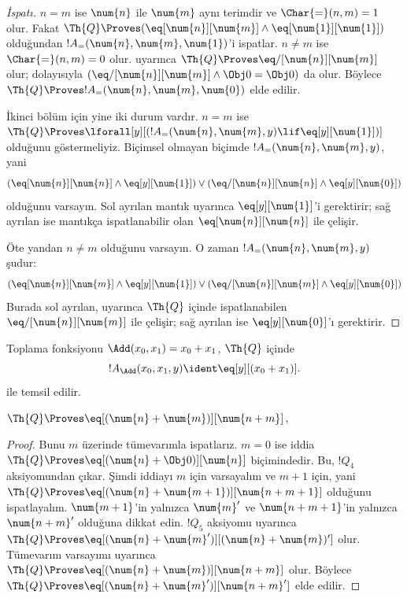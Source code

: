 \documentclass[../../../include/open-logic-section]{subfiles}
\begin{document}
\begin{proof}[ İspatı]
$n=m$ ise $\num{n}$ ile $\num{m}$ aynı terimdir ve $\Char{=}(n,m)=1$ olur.
Fakat $\Th{Q} \Proves (\eq[\num{n}][\num{m}] \land
\eq[\num{1}][\num{1}])$ olduğundan $!A_=(\num{n},\num{m},\num{1})$'i
ispatlar. $n\neq m$ ise $\Char{=}(n,m)=0$ olur.
 uyarınca $\Th{Q} \Proves
\eq/[\num{n}][\num{m}]$ olur; dolayısıyla
$(\eq/[\num{n}][\num{m}] \land \Obj 0 = \Obj 0)$ da olur. Böylece
$\Th{Q} \Proves !A_=(\num{n}, \num{m}, \num{0})$ elde edilir.

İkinci bölüm için yine iki durum vardır. $n=m$ ise
$\Th{Q} \Proves \lforall[y][(!A_=(\num{n}, \num{m}, y)
  \lif \eq[y][\num{1}])]$ olduğunu göstermeliyiz. Biçimsel olmayan biçimde
$!A_=(\num{n},\num{m},y)$, yani
\[
(\eq[\num{n}][\num{n}] \land \eq[y][\num{1}]) \lor
(\eq/[\num{n}][\num{n}] \land \eq[y][\num{0}])
\]
olduğunu varsayın. Sol ayrılan mantık uyarınca $\eq[y][\num{1}]$'i
gerektirir; sağ ayrılan ise mantıkça ispatlanabilir olan
$\eq[\num{n}][\num{n}]$ ile çelişir.

Öte yandan $n\neq m$ olduğunu varsayın. O zaman
$!A_=(\num{n},\num{m},y)$ şudur:
\[
(\eq[\num{n}][\num{m}] \land \eq[y][\num{1}]) \lor
(\eq/[\num{n}][\num{m}] \land \eq[y][\num{0}])
\]
Burada sol ayrılan,  uyarınca $\Th{Q}$ içinde
ispatlanabilen $\eq/[\num{n}][\num{m}]$ ile çelişir; sağ ayrılan ise
$\eq[y][\num{0}]$'ı gerektirir.
\end{proof}

\begin{prop}
Toplama fonksiyonu $\Add(x_0,x_1)=x_0+x_1$, $\Th{Q}$ içinde
\[
  !A_{\Add}(x_0, x_1, y) \ident \eq[y][(x_0 + x_1)].
\]
ile temsil edilir.
\end{prop}

\begin{lem}
$\Th{Q} \Proves \eq[(\num{n} + \num{m})][\num{n+m}]$,
\end{lem}

\begin{proof}
Bunu $m$ üzerinde tümevarımla ispatlarız. $m=0$ ise iddia
$\Th{Q} \Proves \eq[(\num{n} + \Obj 0)][\num{n}]$ biçimindedir. Bu,
$!Q_4$ aksiyomundan çıkar. Şimdi iddiayı $m$ için varsayalım ve $m+1$ için,
yani $\Th{Q} \Proves \eq[(\num{n} +
  \num{m+1})][\num{n+m+1}]$ olduğunu ispatlayalım. $\num{m+1}$'in yalnızca
$\num{m}'$ ve $\num{n+m+1}$'in yalnızca $\num{n+m}'$ olduğuna dikkat edin.
$!Q_5$ aksiyomu uyarınca
$\Th{Q} \Proves \eq[(\num{n} + \num{m}')][(\num{n}+\num{m})']$ olur.
Tümevarım varsayımı uyarınca
$\Th{Q} \Proves \eq[(\num{n} + \num{m})][\num{n+m}]$ olur. Böylece
$\Th{Q} \Proves \eq[(\num{n} + \num{m}')][\num{n+m}']$ elde edilir.
\end{proof}
\end{document}

